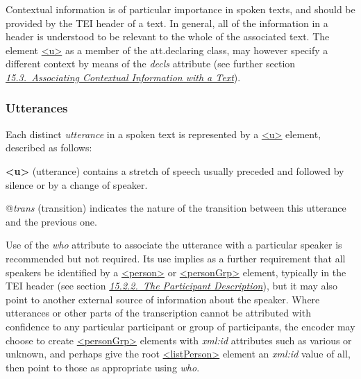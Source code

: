 Contextual information is of particular importance in spoken texts, and should be provided by the TEI header of a text. In general, all of the information in a header is understood to be relevant to the whole of the associated text. The element \hyperref[TEI.u]{<u>} as a member of the \textsf{att.declaring} class, may however specify a different context by means of the {\itshape decls} attribute (see further section \textit{\hyperref[CCAS]{15.3.\ Associating Contextual Information with a Text}}).
\subsubsection[{Utterances}]{Utterances}\label{TSBAUT}\par
Each distinct \textit{utterance} in a spoken text is represented by a \hyperref[TEI.u]{<u>} element, described as follows: 
\begin{sansreflist}
  
\item [\textbf{<u>}] (utterance) contains a stretch of speech usually preceded and followed by silence or by a change of speaker.\hfil\\[-10pt]\begin{sansreflist}
    \item[@{\itshape trans}]
  (transition) indicates the nature of the transition between this utterance and the previous one.
\end{sansreflist}  
\end{sansreflist}
\par
Use of the {\itshape who} attribute to associate the utterance with a particular speaker is recommended but not required. Its use implies as a further requirement that all speakers be identified by a \hyperref[TEI.person]{<person>} or \hyperref[TEI.personGrp]{<personGrp>} element, typically in the TEI header (see section \textit{\hyperref[CCAHPA]{15.2.2.\ The Participant Description}}), but it may also point to another external source of information about the speaker. Where utterances or other parts of the transcription cannot be attributed with confidence to any particular participant or group of participants, the encoder may choose to create \hyperref[TEI.personGrp]{<personGrp>} elements with {\itshape xml:id} attributes such as various or unknown, and perhaps give the root \hyperref[TEI.listPerson]{<listPerson>} element an {\itshape xml:id} value of all, then point to those as appropriate using {\itshape who}.\par
